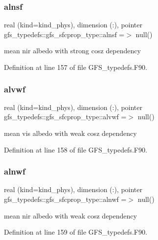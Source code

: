 \subsubsection{alnsf}
{\footnotesize\ttfamily real (kind=kind\+\_\+phys), dimension  (\+:), pointer gfs\+\_\+typedefs\+::gfs\+\_\+sfcprop\+\_\+type\+::alnsf =$>$ null()}



mean nir albedo with strong cosz dependency 



Definition at line 157 of file G\+F\+S\+\_\+typedefs.\+F90.

\mbox{\label{structgfs__typedefs_1_1gfs__sfcprop__type_a578ea005907004946b0f12b1ea8435ce}} 
\subsubsection{alvwf}
{\footnotesize\ttfamily real (kind=kind\+\_\+phys), dimension  (\+:), pointer gfs\+\_\+typedefs\+::gfs\+\_\+sfcprop\+\_\+type\+::alvwf =$>$ null()}



mean vis albedo with weak cosz dependency 



Definition at line 158 of file G\+F\+S\+\_\+typedefs.\+F90.

\mbox{\label{structgfs__typedefs_1_1gfs__sfcprop__type_aef4dcfcf218e9783bd47cca690fd6ea1}} 
\subsubsection{alnwf}
{\footnotesize\ttfamily real (kind=kind\+\_\+phys), dimension  (\+:), pointer gfs\+\_\+typedefs\+::gfs\+\_\+sfcprop\+\_\+type\+::alnwf =$>$ null()}



mean nir albedo with weak cosz dependency 



Definition at line 159 of file G\+F\+S\+\_\+typedefs.\+F90.

\mbox{\label{structgfs__typedefs_1_1gfs__sfcprop__type_a2cbfab28f718cd7d5bcae08385afded3}} 
